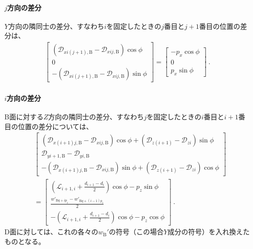 \clearpage
\paragraph*{$j$方向の差分}\noindent
$Y$方向の隣同士の差分、すなわち$i$を固定したときの$j$番目と$j+1$番目の位置の差分は、
\begin{align*}
  \left[
  \begin{array}{c}
    \left(\mathcal D_{xi(j+1),\mathrm B}-\mathcal D_{xij,\mathrm B}\right)\cos\phi\\
    0\\
    -\left(\mathcal D_{xi(j+1),\mathrm B}-\mathcal D_{xij,\mathrm B}\right)\sin\phi
  \end{array}
  \right]
  = \left[
    \begin{array}{c}
      -p_x\cos\phi\\[6pt]
      0\\
      p_x\sin\phi
    \end{array}
    \right]\ .
\end{align*}

\paragraph*{$i$方向の差分}\noindent
B面に対する$Z$方向の隣同士の差分、すなわち$j$を固定したときの$i$番目と$i+1$番目の位置の差分については、
\begin{align*}
 &\left[
  \begin{array}{c}
    \left(\mathcal D_{x(i+1)j,\mathrm B}-\mathcal D_{xij,\mathrm B}\right)\cos\phi
    +\left(\mathcal D_{z(i+1)}-\mathcal D_{zi}\right)\sin\phi\\[3pt]
    \mathcal D_{yi+1,\mathrm B}-\mathcal D_{yi,\mathrm B}\\[3pt]
    -\left(\mathcal D_{x(i+1)j,\mathrm B}-\mathcal D_{xij,\mathrm B}\right)\sin\phi
    +\left(\mathcal D_{z(i+1)}-\mathcal D_{zi}\right)\cos\phi
  \end{array}
  \right]\\
 &= \left[
    \begin{array}{c}
      \displaystyle\left(\mathcal L_{i+1, i}+\frac{d_{i+1}-d_i}2\right)\cos\phi-p_z\sin\phi\\[10pt]
      \displaystyle\frac{w'_{\mathrm Bq+ip_z}-w'_{\mathrm Bq+(i-1)p_z}}2\\[8pt]
      \displaystyle-\left(\mathcal L_{i+1, i}+\frac{d_{i+1}-d_i}2\right)\cos\phi-p_z\cos\phi
    \end{array}
    \right]\ .
\end{align*}
D面に対しては、これの各々の\InnerDiameter$w_\mathrm B'$の符号（この場合$Y$成分の符号）を入れ換えたものとなる。
